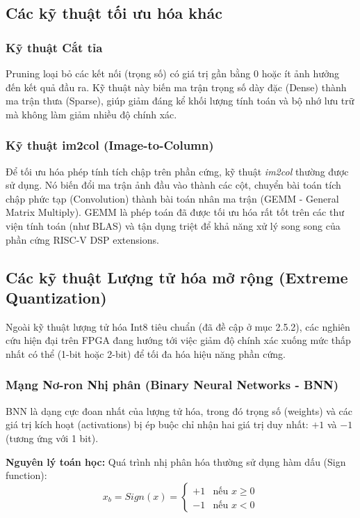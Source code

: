 \subsection{Các kỹ thuật tối ưu hóa khác}

\subsubsection{Kỹ thuật Cắt tỉa }
Pruning loại bỏ các kết nối (trọng số) có giá trị gần bằng 0 hoặc ít ảnh hưởng đến kết quả đầu ra. Kỹ thuật này biến ma trận trọng số dày đặc (Dense) thành ma trận thưa (Sparse), giúp giảm đáng kể khối lượng tính toán và bộ nhớ lưu trữ mà không làm giảm nhiều độ chính xác.

\subsubsection{Kỹ thuật im2col (Image-to-Column)}

Để tối ưu hóa phép tính tích chập trên phần cứng, kỹ thuật \textit{im2col} thường được sử dụng. Nó biến đổi ma trận ảnh đầu vào thành các cột, chuyển bài toán tích chập phức tạp (Convolution) thành bài toán nhân ma trận (GEMM - General Matrix Multiply). GEMM là phép toán đã được tối ưu hóa rất tốt trên các thư viện tính toán (như BLAS) và tận dụng triệt để khả năng xử lý song song của phần cứng RISC-V DSP extensions.

\subsection{Các kỹ thuật Lượng tử hóa mở rộng (Extreme Quantization)}
Ngoài kỹ thuật lượng tử hóa Int8 tiêu chuẩn (đã đề cập ở mục 2.5.2), các nghiên cứu hiện đại trên FPGA đang hướng tới việc giảm độ chính xác xuống mức thấp nhất có thể (1-bit hoặc 2-bit) để tối đa hóa hiệu năng phần cứng.

\subsubsection{Mạng Nơ-ron Nhị phân (Binary Neural Networks - BNN)}
BNN là dạng cực đoan nhất của lượng tử hóa, trong đó trọng số (weights) và các giá trị kích hoạt (activations) bị ép buộc chỉ nhận hai giá trị duy nhất: $+1$ và $-1$ (tương ứng với 1 bit).

\textbf{Nguyên lý toán học:}
Quá trình nhị phân hóa thường sử dụng hàm dấu (Sign function):
\begin{equation}
x_b = Sign(x) = \begin{cases}
+1 & \text{nếu } x \ge 0 \\
-1 & \text{nếu } x < 0
\end{cases}
\end{equation}

